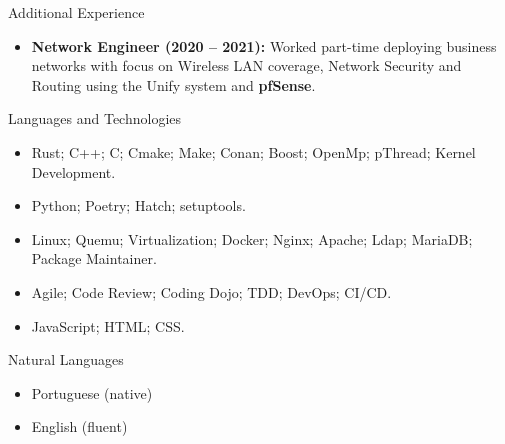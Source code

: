 \documentclass[calibri]{mcdowellcv}
\begin{document}
	\begin{cvsection}{Additional Experience}
		\begin{cvsubsection}{}{}{}
			\begin{itemize}
				\item \textbf{Network Engineer (2020 -- 2021):} Worked part-time deploying business networks with focus on Wireless LAN coverage, Network Security and Routing using the Unify system and \textbf{pfSense}.
			\end{itemize}
		\end{cvsubsection}
	\end{cvsection}

	\begin{cvsection}{Languages and Technologies}
		\begin{cvsubsection}{}{}{}
			\begin{itemize}
				\item Rust; C++; C\@; Cmake; Make; Conan; Boost; OpenMp; pThread; Kernel Development.
				\item Python; Poetry; Hatch; setuptools.
				\item Linux; Quemu; Virtualization; Docker; Nginx; Apache; Ldap; MariaDB\@; Package Maintainer.
				\item Agile; Code Review; Coding Dojo; TDD\@; DevOps; CI/CD\@.
				\item JavaScript; HTML\@; CSS\@.
			\end{itemize}
		\end{cvsubsection}
	\end{cvsection}

	\begin{cvsection}{Natural Languages}
		\begin{cvsubsection}{}{}{}
			\begin{itemize}
					\item Portuguese (native)
					\item English (fluent)
			\end{itemize}
		\end{cvsubsection}
	\end{cvsection}
\end{document}
